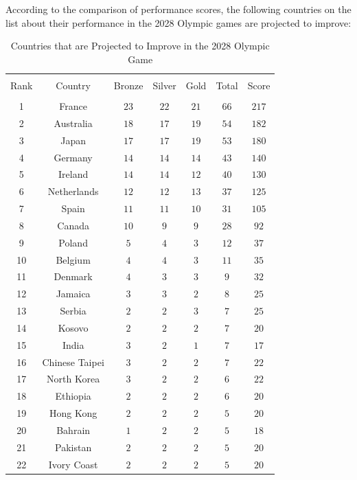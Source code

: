 \documentclass{mcmthesis}
\begin{document}
According to the comparison of performance scores, the following countries on the list about their performance in the 2028 Olympic games are projected to improve:

\begin{longtable}{@{\extracolsep{5pt}} ccccccc} 
  \caption{Countries that are Projected to Improve in the 2028 Olympic Game} 
  \label{} 
\\[-1.8ex]\hline 
\hline \\[-1.8ex] 
Rank & Country & Bronze & Silver & Gold & Total & Score\\ 
\hline \\[-1.8ex] 
1 & France & $23$ & $22$ & $21$ & $66$ & $217$ \\ 
2 & Australia & $18$ & $17$ & $19$ & $54$ & $182$ \\ 
3 & Japan & $17$ & $17$ & $19$ & $53$ & $180$ \\ 
4 & Germany & $14$ & $14$ & $14$ & $43$ & $140$ \\ 
5 & Ireland & $14$ & $14$ & $12$ & $40$ & $130$ \\ 
6 & Netherlands & $12$ & $12$ & $13$ & $37$ & $125$ \\ 
7 & Spain & $11$ & $11$ & $10$ & $31$ & $105$ \\ 
8 & Canada & $10$ & $9$ & $9$ & $28$ & $92$ \\ 
9 & Poland & $5$ & $4$ & $3$ & $12$ & $37$ \\ 
10 & Belgium & $4$ & $4$ & $3$ & $11$ & $35$ \\ 
11 & Denmark & $4$ & $3$ & $3$ & $9$ & $32$ \\ 
12 & Jamaica & $3$ & $3$ & $2$ & $8$ & $25$ \\ 
13 & Serbia & $2$ & $2$ & $3$ & $7$ & $25$ \\ 
14 & Kosovo & $2$ & $2$ & $2$ & $7$ & $20$ \\ 
15 & India & $3$ & $2$ & $1$ & $7$ & $17$ \\ 
16 & Chinese Taipei & $3$ & $2$ & $2$ & $7$ & $22$ \\ 
17 & North Korea & $3$ & $2$ & $2$ & $6$ & $22$ \\ 
18 & Ethiopia & $2$ & $2$ & $2$ & $6$ & $20$ \\ 
19 & Hong Kong & $2$ & $2$ & $2$ & $5$ & $20$ \\ 
20 & Bahrain & $1$ & $2$ & $2$ & $5$ & $18$ \\ 
21 & Pakistan & $2$ & $2$ & $2$ & $5$ & $20$ \\ 
22 & Ivory Coast & $2$ & $2$ & $2$ & $5$ & $20$ \\ 

\end{longtable}
\end{document}
